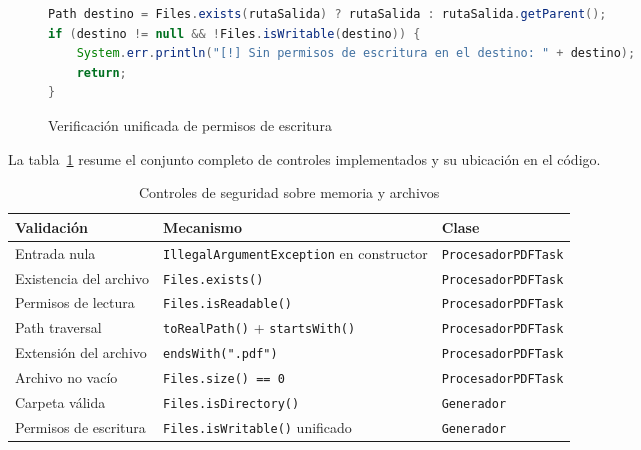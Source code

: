\begin{figure}[H]
    \centering
    \begin{minipage}{0.9\textwidth}
    \caption{Verificación unificada de permisos de escritura}
    \label{code:secure-write-perms}
    \vspace{-0.2cm}
    \begin{lstlisting}[language=Java, basicstyle=\scriptsize\ttfamily]
Path destino = Files.exists(rutaSalida) ? rutaSalida : rutaSalida.getParent();
if (destino != null && !Files.isWritable(destino)) {
    System.err.println("[!] Sin permisos de escritura en el destino: " + destino);
    return;
}
    \end{lstlisting}
    \end{minipage}
\end{figure}

La tabla~\ref{tab:secure-validaciones} resume el conjunto completo de controles implementados
y su ubicación en el código.

\begin{table}[H]
\centering
\caption{Controles de seguridad sobre memoria y archivos}
\label{tab:secure-validaciones}
\begin{tabular}{|p{4cm}|p{4.5cm}|p{4cm}|}
\hline
\textbf{Validación} & \textbf{Mecanismo} & \textbf{Clase} \\
\hline
Entrada nula & \texttt{IllegalArgumentException} en constructor & \texttt{ProcesadorPDFTask} \\
\hline
Existencia del archivo & \texttt{Files.exists()} & \texttt{ProcesadorPDFTask} \\
\hline
Permisos de lectura & \texttt{Files.isReadable()} & \texttt{ProcesadorPDFTask} \\
\hline
Path traversal & \texttt{toRealPath()} + \texttt{startsWith()} & \texttt{ProcesadorPDFTask} \\
\hline
Extensión del archivo & \texttt{endsWith(".pdf")} & \texttt{ProcesadorPDFTask} \\
\hline
Archivo no vacío & \texttt{Files.size() == 0} & \texttt{ProcesadorPDFTask} \\
\hline
Carpeta válida & \texttt{Files.isDirectory()} & \texttt{Generador} \\
\hline
Permisos de escritura & \texttt{Files.isWritable()} unificado & \texttt{Generador} \\
\hline
\end{tabular}
\end{table}
